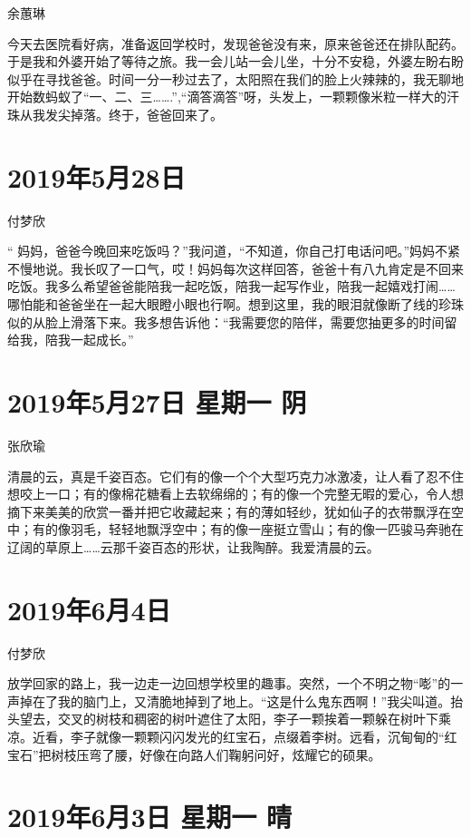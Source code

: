 余蕙琳

今天去医院看好病，准备返回学校时，发现爸爸没有来，原来爸爸还在排队配药。于是我和外婆开始了等待之旅。我一会儿站一会儿坐，十分不安稳，外婆左盼右盼似乎在寻找爸爸。时间一分一秒过去了，太阳照在我们的脸上火辣辣的，我无聊地开始数蚂蚁了``一、二、三\ldots{}\ldots{}.'',``滴答滴答''呀，头发上，一颗颗像米粒一样大的汗珠从我发尖掉落。终于，爸爸回来了。

\section{2019年5月28日}

付梦欣

``
妈妈，爸爸今晚回来吃饭吗？''我问道，``不知道，你自己打电话问吧。''妈妈不紧不慢地说。我长叹了一口气，哎！妈妈每次这样回答，爸爸十有八九肯定是不回来吃饭。我多么希望爸爸能陪我一起吃饭，陪我一起写作业，陪我一起嬉戏打闹\ldots{}\ldots{}哪怕能和爸爸坐在一起大眼瞪小眼也行啊。想到这里，我的眼泪就像断了线的珍珠似的从脸上滑落下来。我多想告诉他：``我需要您的陪伴，需要您抽更多的时间留给我，陪我一起成长。''

\section{2019年5月27日 星期一 阴}

张欣瑜

清晨的云，真是千姿百态。它们有的像一个个大型巧克力冰激凌，让人看了忍不住想咬上一口；有的像棉花糖看上去软绵绵的；有的像一个完整无暇的爱心，令人想摘下来美美的欣赏一番并把它收藏起来；有的薄如轻纱，犹如仙子的衣带飘浮在空中；有的像羽毛，轻轻地飘浮空中；有的像一座挺立雪山；有的像一匹骏马奔驰在辽阔的草原上\ldots{}\ldots{}云那千姿百态的形状，让我陶醉。我爱清晨的云。

\section{2019年6月4日}

付梦欣

放学回家的路上，我一边走一边回想学校里的趣事。突然，一个不明之物``嘭''的一声掉在了我的脑门上，又清脆地掉到了地上。``这是什么鬼东西啊！''我尖叫道。抬头望去，交叉的树枝和稠密的树叶遮住了太阳，李子一颗挨着一颗躲在树叶下乘凉。近看，李子就像一颗颗闪闪发光的红宝石，点缀着李树。远看，沉甸甸的``红宝石''把树枝压弯了腰，好像在向路人们鞠躬问好，炫耀它的硕果。

\section{2019年6月3日 星期一 晴}

